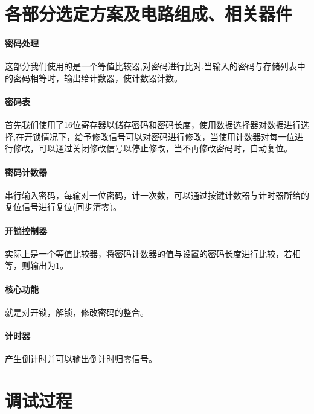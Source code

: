 \documentclass[a4paper,11pt]{ctexart}
\begin{document}
\section{各部分选定方案及电路组成、相关器件}
\paragraph{密码处理}这部分我们使用的是一个等值比较器,对密码进行比对,当输入的密码与存储列表中的密码相等时，输出给计数器，使计数器计数。
\paragraph{密码表}首先我们使用了16位寄存器以储存密码和密码长度，使用数据选择器对数据进行选择,在开锁情况下，给予修改信号可以对密码进行修改，当使用计数器对每一位进行修改，可以通过关闭修改信号以停止修改，当不再修改密码时，自动复位。
\paragraph{密码计数器}串行输入密码，每输对一位密码，计一次数，可以通过按键计数器与计时器所给的复位信号进行复位(同步清零)。
\paragraph{开锁控制器}实际上是一个等值比较器，将密码计数器的值与设置的密码长度进行比较，若相等，则输出为1。
\paragraph{核心功能}就是对开锁，解锁，修改密码的整合。
\paragraph{计时器}产生倒计时并可以输出倒计时归零信号。
\section{调试过程}
\end{document}
